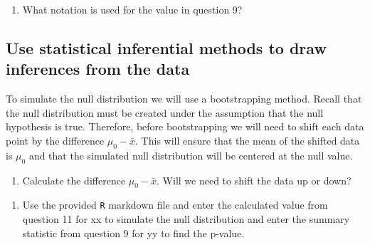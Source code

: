 \documentclass[
]{report}
\providecommand{\tightlist}{%
  \setlength{\itemsep}{0pt}\setlength{\parskip}{0pt}}
\begin{document}
\vspace{0.3in}

\begin{enumerate}
\def\labelenumi{\arabic{enumi}.}
\setcounter{enumi}{9}
\tightlist
\item
  What notation is used for the value in question 9?
\end{enumerate}

\vspace{0.3in}

\hypertarget{use-statistical-inferential-methods-to-draw-inferences-from-the-data}{%
\subsection*{Use statistical inferential methods to draw inferences from the data}\label{use-statistical-inferential-methods-to-draw-inferences-from-the-data}}

To simulate the null distribution we will use a bootstrapping method. Recall that the null distribution must be created under the assumption that the null hypothesis is true. Therefore, before bootstrapping we will need to shift each data point by the difference \(\mu_0 - \bar{x}\). This will ensure that the mean of the shifted data is \(\mu_0\) and that the simulated null distribution will be centered at the null value.

\begin{enumerate}
\def\labelenumi{\arabic{enumi}.}
\setcounter{enumi}{10}
\tightlist
\item
  Calculate the difference \(\mu_0 - \bar{x}\). Will we need to shift the data up or down?
\end{enumerate}

\vspace{.7in}

\begin{enumerate}
\def\labelenumi{\arabic{enumi}.}
\setcounter{enumi}{11}
\tightlist
\item
  Use the provided \texttt{R} markdown file and enter the calculated value from question 11 for xx to simulate the null distribution and enter the summary statistic from question 9 for yy to find the p-value.
\end{enumerate}
\end{document}
